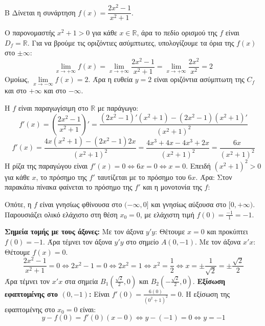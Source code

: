 \begin{thema}{Β}
Δίνεται η συνάρτηση $f(x) = \dfrac{2x^2-1}{x^2+1}$.

\begin{erwthma}
\item Ο παρονομαστής $x^2+1 > 0$ για κάθε $x \in \mathbb{R}$, άρα το πεδίο ορισμού της $f$ είναι $D_f = \mathbb{R}$.
Για να βρούμε τις οριζόντιες ασύμπτωτες, υπολογίζουμε τα όρια της $f(x)$ στο $\pm\infty$:
\[ \lim_{x\to+\infty} f(x) = \lim_{x\to+\infty} \frac{2x^2-1}{x^2+1} = \lim_{x\to+\infty} \frac{2x^2}{x^2} = 2 \]
Ομοίως, $\lim\limits_{x\to-\infty} f(x) = 2$.
Άρα η ευθεία $y = 2$ είναι οριζόντια ασύμπτωτη της $C_f$ και στο $+\infty$ και στο $-\infty$.

\item Η $f$ είναι παραγωγίσιμη στο $\mathbb{R}$ με παράγωγο:
\[ f'(x) = \left( \frac{2x^2-1}{x^2+1} \right)' = \frac{(2x^2-1)'(x^2+1) - (2x^2-1)(x^2+1)'}{(x^2+1)^2} \]
\[ f'(x) = \frac{4x(x^2+1) - (2x^2-1)2x}{(x^2+1)^2} = \frac{4x^3+4x-4x^3+2x}{(x^2+1)^2} = \frac{6x}{(x^2+1)^2} \]
Η ρίζα της παραγώγου είναι $f'(x) = 0 \Leftrightarrow 6x = 0 \Leftrightarrow x = 0$.
Επειδή $(x^2+1)^2 > 0$ για κάθε $x$, το πρόσημο της $f'$ ταυτίζεται με το πρόσημο του $6x$. Άρα:
Στον παρακάτω πίνακα φαίνεται το πρόσημο της $f'$ και η μονοτονία της $f$:
\begin{center}
\end{center}
Οπότε, η $f$ είναι γνησίως φθίνουσα στο $(-\infty, 0]$ και γνησίως αύξουσα στο $[0, +\infty)$.
Παρουσιάζει ολικό ελάχιστο στη θέση $x_0 = 0$, με ελάχιστη τιμή $f(0) = \frac{-1}{1} = -1$.

\item \textbf{Σημεία τομής με τους άξονες:}
Με τον άξονα $y'y$: Θέτουμε $x=0$ και προκύπτει $f(0) = -1$. Άρα τέμνει τον άξονα $y'y$ στο σημείο $A(0, -1)$.
Με τον άξονα $x'x$: Θέτουμε $f(x) = 0$.
\[ \frac{2x^2-1}{x^2+1} = 0 \Leftrightarrow 2x^2-1 = 0 \Leftrightarrow 2x^2 = 1 \Leftrightarrow x^2 = \frac{1}{2} \Leftrightarrow x = \pm\frac{1}{\sqrt{2}} = \pm\frac{\sqrt{2}}{2} \]
Άρα τέμνει τον $x'x$ στα σημεία $B_1\left(\frac{\sqrt{2}}{2}, 0\right)$ και $B_2\left(-\frac{\sqrt{2}}{2}, 0\right)$.
\textbf{Εξίσωση εφαπτομένης στο $(0, -1)$:}
Είναι $f'(0) = \frac{6(0)}{(0^2+1)^2} = 0$. Η εξίσωση της εφαπτομένης στο $x_0 = 0$ είναι:
\[ y - f(0) = f'(0)(x-0) \Leftrightarrow y - (-1) = 0 \Leftrightarrow y = -1 \]


\end{erwthma}
\end{thema}
